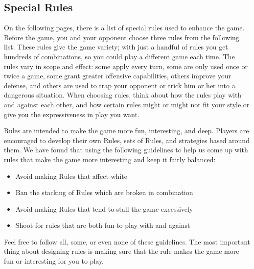 \documentclass[../rulebook.tex]{subfiles}
\begin{document}
\subsection*{Special Rules}
On the following pages, there is a list of special rules used
to enhance the game.
Before the game, you and your opponent choose three rules from the 
following list. 
These rules give the game variety; with just a handful of rules
you get hundreds of combinations, so you could play a different game
each time.
The rules vary in scope and effect: some apply every turn,
some are only used once or twice a game,
some grant greater offensive capabilities,
others improve your defense,
and others are used to trap your opponent or trick him or her
into a dangerous situation.
When choosing rules, think about how the rules play
with and against each other, and how certain rules might or might
not fit your style or give you the expressiveness in play you want.

Rules are intended to make the game more fun, interesting, and deep.
Players are encouraged to develop their own Rules, sets of Rules,
and strategies based around them.
We have found that using the following guidelines to help us come up
with rules that make the game more interesting and keep it fairly balanced:
\begin{itemize}
\item Avoid making Rules that affect white
\item Ban the stacking of Rules which are broken in combination
\item Avoid making Rules that tend to stall the game excessively
\item Shoot for rules that are both fun to play with and against
\end{itemize}
Feel free to follow all, some, or even none of these guidelines.
The most important thing about designing rules is making sure
that the rule makes the game more fun or interesting for you to play.
\end{document}
